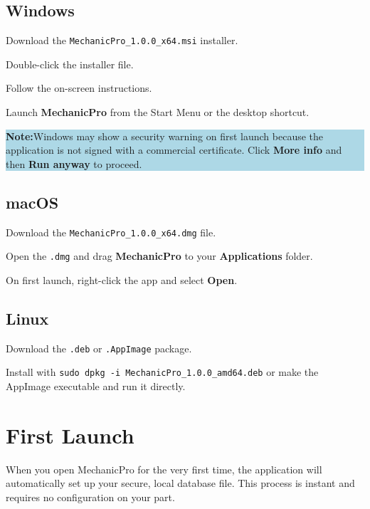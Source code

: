 \documentclass[12pt, a4paper]{report}
\newcommand{\notebox}[1]{%
	\vspace{6pt}
	\noindent
	\colorbox{LightBlue}{%
		\begin{minipage}{\dimexpr\linewidth-2\fboxsep}%
			\vspace{5pt}
			\small\textbf{\color{Blue}Note:\space}\color{Navy}#1
			\vspace{5pt}
		\end{minipage}%
	}
	\vspace{6pt}
}
\newcommand{\ui}[1]{\textbf{\color{Navy}#1}}
\begin{document}
	\subsection{Windows}
	
	\begin{steps}
		\item Download the \texttt{MechanicPro\_1.0.0\_x64.msi} installer.
		\item Double-click the installer file.
		\item Follow the on-screen instructions.
		\item Launch \ui{MechanicPro} from the Start Menu or the desktop shortcut.
	\end{steps}
	
	\notebox{Windows may show a security warning on first launch because the
		application is not signed with a commercial certificate. Click
		\ui{More info} and then \ui{Run anyway} to proceed.}
	
	\subsection{macOS}
	
	\begin{steps}
		\item Download the \texttt{MechanicPro\_1.0.0\_x64.dmg} file.
		\item Open the \texttt{.dmg} and drag \ui{MechanicPro} to your
		\ui{Applications} folder.
		\item On first launch, right-click the app and select \ui{Open}.
	\end{steps}
	
	\subsection{Linux}
	
	\begin{steps}
		\item Download the \texttt{.deb} or \texttt{.AppImage} package.
		\item Install with \texttt{sudo dpkg -i MechanicPro\_1.0.0\_amd64.deb}
		or make the AppImage executable and run it directly.
	\end{steps}
	
	\section{First Launch}
	When you open MechanicPro for the very first time, the application will automatically set up your secure, local database file. This process is instant and requires no configuration on your part.
	
\end{document}
